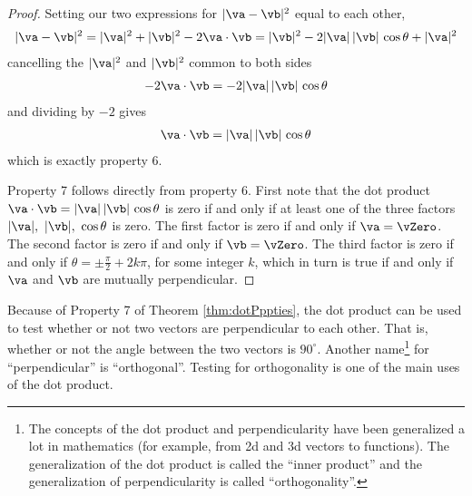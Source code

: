 \begin{proof}
Setting our two expressions for $|\va-\vb|^2$ equal to each other,
\begin{align*}
|\va-\vb|^2=|\va|^2+|\vb|^2-2\va\cdot\vb
=|\vb|^2-2|\va|\,|\vb|\,\cos\theta+|\va|^2
\end{align*}
cancelling the $|\va|^2$ and $|\vb|^2$ common to both sides
\begin{align*}
-2\va\cdot\vb
=-2|\va|\,|\vb|\,\cos\theta
\end{align*}
and dividing by $-2$ gives 
\begin{align*}
\va\cdot\vb=|\va|\,|\vb|\,\cos\theta
\end{align*}
which is exactly property 6. 


Property 7 follows directly from property 6. First note that the dot product $\va\cdot\vb=|\va|\,|\vb|\,\cos\theta$
is zero if and only if at least one of the three factors 
$|\va|,\ |\vb|,\ \cos\theta$ is zero. The first factor is zero if
and only if $\va=\vZero $. The second factor is zero if and only if 
$\vb=\vZero $.
The third factor is zero if and only if $\theta=\pm\tfrac{\pi}{2}+2k\pi$,
for some integer $k$, which in turn is true if and only if $\va$ and 
$\vb$ are mutually perpendicular.
\end{proof}
Because of Property 7 of Theorem \ref{thm:dotPppties}, the dot product 
can be used to test whether or not two vectors are perpendicular to 
each other. That is, whether or not the angle between the two vectors 
is $90^\circ$. Another name\footnote{The concepts of the dot product
and perpendicularity have been generalized a lot in mathematics (for example,
from 2d and 3d vectors to functions). The generalization of the dot 
product is called the ``inner product'' and the generalization 
of perpendicularity is called ``orthogonality''.} for ``perpendicular'' 
is ``orthogonal''. Testing for orthogonality is one of the main uses of the
dot product. 


